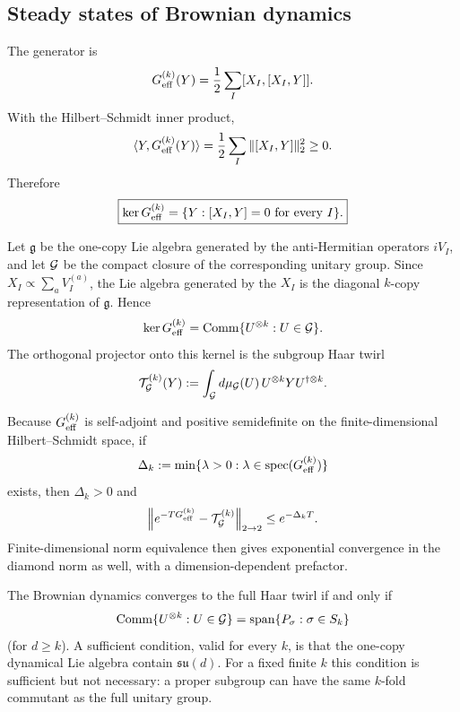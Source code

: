 \documentclass{article}
\theoremstyle{definition}
\begin{document}
\subsection{Steady states of Brownian dynamics}

The generator is
\begin{equation}
    G_{\rm eff}^{(k)}(Y)
    =\frac12\sum_I[X_I,[X_I,Y]].
\end{equation}
With the Hilbert--Schmidt inner product,
\begin{equation}
    \langle Y,G_{\rm eff}^{(k)}(Y)\rangle
    =\frac12\sum_I\|[X_I,Y]\|_2^2\ge0.
\end{equation}
Therefore
\begin{equation}
    \boxed{
    \ker G_{\rm eff}^{(k)}
    =\{Y:[X_I,Y]=0\ \text{for every }I\}.
    }
\end{equation}

Let $\mathfrak g$ be the one-copy Lie algebra generated by the
anti-Hermitian operators $iV_I$, and let ${\cal G}$ be the compact closure
of the corresponding unitary group.  Since
$X_I\propto\sum_aV_I^{(a)}$, the Lie algebra generated by the $X_I$ is the
diagonal $k$-copy representation of $\mathfrak g$.  Hence
\begin{equation}
    \ker G_{\rm eff}^{(k)}
    ={\rm Comm}\{U^{\otimes k}:U\in{\cal G}\}.
\end{equation}
The orthogonal projector onto this kernel is the subgroup Haar twirl
\begin{equation}
    {\cal T}_{\cal G}^{(k)}(Y)
    :=\int_{\cal G}d\mu_{\cal G}(U)\,
      U^{\otimes k}YU^{\dagger\otimes k}.
\end{equation}

Because $G_{\rm eff}^{(k)}$ is self-adjoint and positive semidefinite on the
finite-dimensional Hilbert--Schmidt space, if
\begin{equation}
    \Delta_k
    :=\min\{\lambda>0:\lambda\in{\rm spec}(G_{\rm eff}^{(k)})\}
\end{equation}
exists, then $\Delta_k>0$ and
\begin{equation}
    \left\|
       e^{-TG_{\rm eff}^{(k)}}-{\cal T}_{\cal G}^{(k)}
    \right\|_{2\to2}
    \le e^{-\Delta_kT}.
\end{equation}
Finite-dimensional norm equivalence then gives exponential convergence in
the diamond norm as well, with a dimension-dependent prefactor.

The Brownian dynamics converges to the full Haar twirl if and only if
\begin{equation}
    {\rm Comm}\{U^{\otimes k}:U\in{\cal G}\}
    ={\rm span}\{P_\sigma:\sigma\in S_k\}
\end{equation}
(for $d\ge k$).  A sufficient condition, valid for every $k$, is that the
one-copy dynamical Lie algebra contain $\mathfrak{su}(d)$.  For a fixed
finite $k$ this condition is sufficient but not necessary: a proper
subgroup can have the same $k$-fold commutant as the full unitary group.
\end{document}
